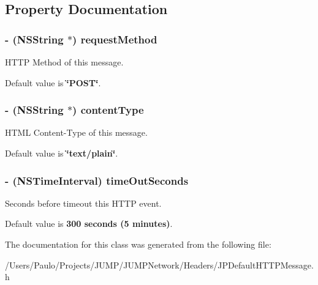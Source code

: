 \subsection{Property Documentation}
\hypertarget{a00012_a95ef26b022a5d51a8d5ee34bbbb7e399}{
\subsubsection[{requestMethod}]{\setlength{\rightskip}{0pt plus 5cm}-\/ (NSString $\ast$) requestMethod}}
\label{a00012_a95ef26b022a5d51a8d5ee34bbbb7e399}


HTTP Method of this message. 

Default value is {\bfseries \char`\"{}POST\char`\"{}}. \hypertarget{a00012_ac9ab3ce00110b03ae50285c1d5b6e03f}{
\subsubsection[{contentType}]{\setlength{\rightskip}{0pt plus 5cm}-\/ (NSString $\ast$) contentType}}
\label{a00012_ac9ab3ce00110b03ae50285c1d5b6e03f}


HTML Content-\/Type of this message. 

Default value is {\bfseries \char`\"{}text/plain\char`\"{}}. \hypertarget{a00012_a47d1d71ffd2145a805f29db0e2dcf5ae}{
\subsubsection[{timeOutSeconds}]{\setlength{\rightskip}{0pt plus 5cm}-\/ (NSTimeInterval) timeOutSeconds}}
\label{a00012_a47d1d71ffd2145a805f29db0e2dcf5ae}


Seconds before timeout this HTTP event. 

Default value is {\bfseries 300 seconds (5 minutes)}. 

The documentation for this class was generated from the following file:\begin{DoxyCompactItemize}
\item 
/Users/Paulo/Projects/JUMP/JUMPNetwork/Headers/JPDefaultHTTPMessage.h\end{DoxyCompactItemize}
